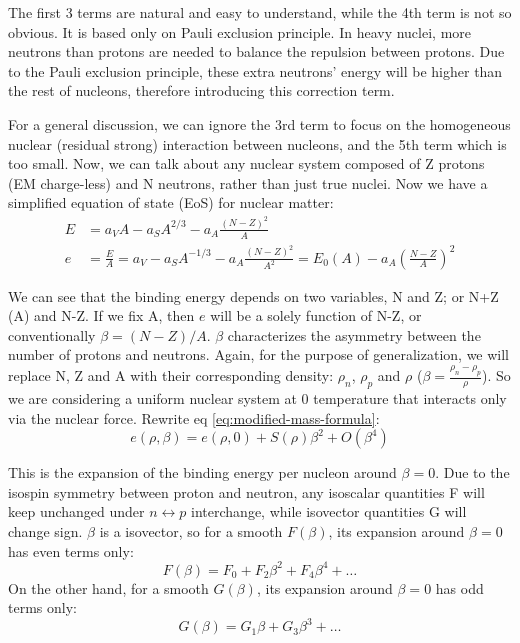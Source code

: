 The first 3 terms are natural and easy to understand, while the 4th term is 
not so obvious. It is based only on Pauli exclusion principle. In heavy nuclei,
more neutrons than protons are needed to balance the repulsion between protons.
Due to the Pauli exclusion principle, these extra neutrons' energy will be 
higher than the rest of nucleons, therefore introducing this correction term.

For a general discussion, we can ignore the 3rd term to focus on the homogeneous
nuclear (residual strong) interaction between nucleons, and the 5th term which is too small.
Now, we can talk about any nuclear system composed of Z protons (EM charge-less) 
and N neutrons, rather than just true nuclei. Now we have a simplified equation
of state (EoS) for nuclear matter:
\begin{equation}
    \label{eq:modified-mass-formula}
    \begin{aligned}
	E &= a_V A - a_S A^{2/3} - a_A\frac{(N-Z)^2}{A}  \\
	e &= \frac{E}{A} = a_V - a_S A^{-1/3} - a_A\frac{(N-Z)^2}{A^2} = E_0(A) - a_A\left(\frac{N-Z}{A}\right)^2 
    \end{aligned}
\end{equation}

We can see that the binding energy depends on two variables, N and Z; or N+Z (A)
and N-Z. If we fix A, then $e$ will be a solely function of N-Z, or conventionally
$\beta = (N-Z)/A$. $\beta$ characterizes the asymmetry between the number of 
protons and neutrons. Again, for the purpose of generalization, we will replace
N, Z and A with their corresponding density: $\rho_n$, $\rho_p$ and $\rho$
($\beta = \frac{\rho_n - \rho_p}{\rho}$). 
So we are considering a uniform nuclear system at 0 temperature that interacts
only via the nuclear force.
Rewrite eq \eqref{eq:modified-mass-formula}:
\begin{equation}
    \label{eq:symmetry-energy}
    e(\rho, \beta) = e(\rho, 0) + S(\rho)\beta^2 + O(\beta^4)
\end{equation}

This is the expansion of the binding energy per nucleon around $\beta = 0$.
Due to the isospin symmetry between proton and neutron, any isoscalar quantities
F will keep unchanged under $n \leftrightarrow p$ interchange, while isovector 
quantities G will change sign. $\beta$ is a isovector, so for a smooth $F(\beta)$,
its expansion around $\beta = 0$ has even terms only:
$$ F(\beta) = F_0 + F_2\beta^2 + F_4\beta^4 + \dots $$
On the other hand, for a smooth $G(\beta)$, its expansion around $\beta = 0$ has
odd terms only:
$$ G(\beta) = G_1\beta + G_3\beta^3 + \dots $$


